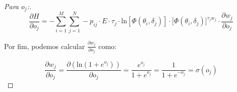\begin{proof}[Para $o_j$:]
    \begin{equation}
            \frac{\partial H}{\partial o_j} = - \sum_{i=1}^{M}\sum_{j=1}^{N} -p_{ij}\cdot E\cdot \tau_j \cdot \text{ln}[\Phi(\theta_i, \delta_j)] \cdot \big[\Phi(\theta_i, \delta_j)]^{\tau_j w_j} \cdot \frac{\partial w_j}{\partial o_j}
    \end{equation}
    
    \noindent Por fim, podemos calcular  $\frac{\partial w_j}{\partial o_j}$ como:
    
    \begin{equation}
        \frac{\partial w_j}{\partial o_j} = \frac{\partial (\text{ln}(1 + e^{o_j}) )}{\partial o_j} = \frac{e^{o_j}}{1 + e^{o_j}} = \frac{1}{1 + e^{-o_j}} = \sigma(o_j)
    \end{equation}
\end{proof}

